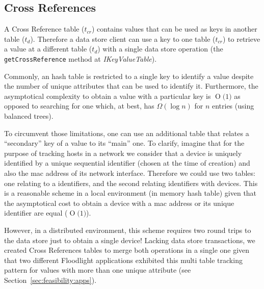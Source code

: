 \documentclass[12pt,openright,twoside]{report}
\newcommand{\BigO}[1]{\ensuremath{\operatorname{O}\bigl(#1\bigr)}}
\begin{document}
\subsection{Cross References} 
A Cross Reference table ($t_{cr}$) contains values that can be used as keys in another table ($t_{d}$). 
Therefore a data store client can use a key to one table ($t_{cr}$) to retrieve a value at  a different table ($t_{d}$) with a  single data store operation (the \texttt{getCrossReference} method at \emph{IKeyValueTable}). 

Commonly, an hash table is restricted to a single key to identify a value despite the  number of unique attributes  that can be used to identify it. 
Furthermore, the asymptotical complexity to obtain a value with a particular key is \BigO{1} as opposed to searching for one which, at best, has $\Omega(\log n)$ for $n$ entries (using balanced trees). 

To circumvent those limitations, one can use an additional table that relates a ``secondary'' key of a value to its ``main'' one. 
To clarify, imagine that for the purpose of tracking hosts in a network we consider that a device is uniquely identified by a unique sequential identifier (chosen at the time of creation) and also the  \gls{mac} address of its network interface. 
Therefore we could use two tables: one relating  to a identifiers, and the second relating identifiers with devices.
This is a reasonable scheme in a local environment (in memory hash table) given that the asymptotical cost to obtain a device with a \gls{mac} address or its unique identifier are equal (\BigO{1}). 

However, in a distributed environment, this scheme requires two round trips to the data store just to obtain a single device! Lacking data store transactions, we created Cross References tables to merge both operations in a single one given that two different Floodlight applications exhibited this multi table tracking pattern for values with more than one unique attribute (see Section~\ref{sec:feasibility:apps}). 
\end{document}
